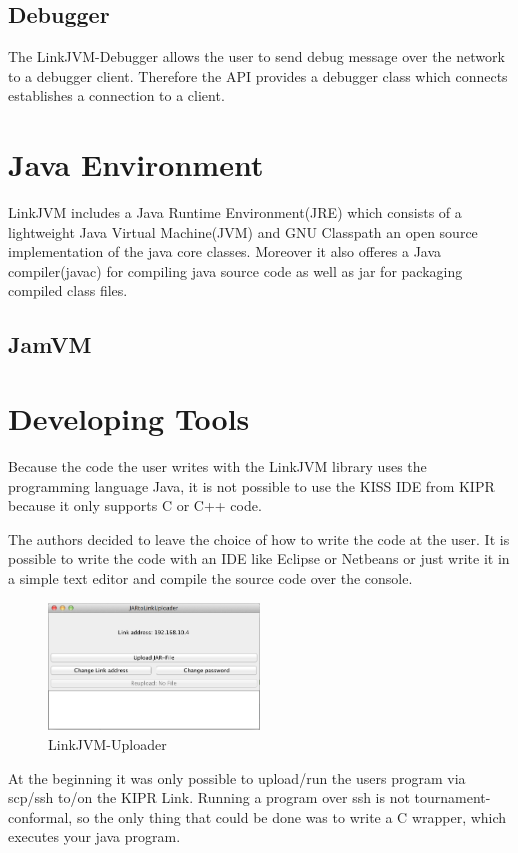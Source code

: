 \documentclass{juniorjournal}
\begin{document}
\subsection{Debugger}
The LinkJVM-Debugger allows the user to send debug message over the network to a debugger client.
Therefore the API provides a debugger class which connects establishes a connection to a client.


\section{Java Environment}
LinkJVM includes a Java Runtime Environment(JRE) which consists of a lightweight Java Virtual Machine(JVM) and GNU Classpath an open source implementation of the java core classes.
Moreover it also offeres a Java compiler(javac) for compiling java source code as well as jar for packaging compiled class files.
\subsection{JamVM}

\section{Developing Tools}
Because the code the user writes with the LinkJVM library uses the programming 
language Java, it is not possible to use the KISS IDE from KIPR because it only 
supports C or C++ code.

The authors decided to leave the choice of how to write the code at the user. It 
is possible to write the code with an IDE like Eclipse or Netbeans or just write 
it in a simple text editor and compile the source code over the console.

\begin{figure}[htbp]
\centering
\includegraphics[width=0.5\textwidth]{images/linkjvm_uploader.jpg}
\caption{LinkJVM-Uploader}
\label{fig:linkjvm_uploader}
\end{figure}

At the beginning it was only possible to upload/run the users program via scp/ssh to/on the KIPR Link.
Running a program over ssh is not tournament-conformal, so the only thing that could be done 
was to write a C wrapper, which executes your java program.
\end{document}
